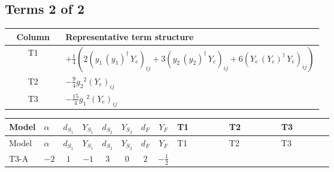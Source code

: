 \documentclass[8pt]{article}
\begin{document}
\begin{landscape}
\subsection*{Terms 2 of 2}
\begin{center}
\begin{tabular}{@{}c >{\raggedright\arraybackslash}p{0.82\linewidth}@{}}
\toprule
Column & Representative term structure \\
\midrule
T1 & \(\displaystyle +\frac{1}{4} (2 \left({y_1}\,\left({y_1}\right)^{\dagger}\,{Y_e}\right)_{ij}+3 \left({y_2}\,\left({y_2}\right)^{\dagger}\,{Y_e}\right)_{ij}+6 \left({Y_e}\,\left({Y_e}\right)^{\dagger}\,{Y_e}\right)_{ij})\) \\
\midrule
T2 & \(\displaystyle -\frac{9}{4} {g_2}^2 \left({Y_e}\right)_{ij}\) \\
\midrule
T3 & \(\displaystyle -\frac{15}{4} {g_1}^2 \left({Y_e}\right)_{ij}\) \\
\midrule
\bottomrule
\end{tabular}
\end{center}
\smallskip
\tiny
\begin{longtable}{@{}llcccccc >{\raggedright\arraybackslash}p{0.21\linewidth} >{\raggedright\arraybackslash}p{0.21\linewidth} >{\raggedright\arraybackslash}p{0.21\linewidth}@{}}
\toprule
Model & $\alpha$ & $d_{S_1}$ & $Y_{S_1}$ & $d_{S_2}$ & $Y_{S_2}$ & $d_F$ & $Y_F$ & T1 & T2 & T3 \\
\midrule
\endfirsthead
\toprule
Model & $\alpha$ & $d_{S_1}$ & $Y_{S_1}$ & $d_{S_2}$ & $Y_{S_2}$ & $d_F$ & $Y_F$ & T1 & T2 & T3 \\
\midrule
\endhead
T3-A & $-2$ & $1$ & $-1$ & $3$ & $0$ & $2$ & $-\frac{1}{2}$ & \scriptsize\adjustbox{max width=\linewidth}{$\begin{gathered} +\frac{1}{4} (2 \left({y_1}\,\left({y_1}\right)^{\dagger}\,{Y_e}\right)_{ij}+3 \left({y_2}\,\left({y_2}\right)^{\dagger}\,{Y_e}\right)_{ij}+6 \left({Y_e}\,\left({Y_e}\right)^{\dagger}\,{Y_e}\right)_{ij})\end{gathered}$} & \scriptsize\adjustbox{max width=\linewidth}{$\begin{gathered} -\frac{9}{4} {g_2}^2 \left({Y_e}\right)_{ij}\end{gathered}$} & \scriptsize\adjustbox{max width=\linewidth}{$\begin{gathered} -\frac{15}{4} {g_1}^2 \left({Y_e}\right)_{ij}\end{gathered}$} \\
\midrule
\bottomrule
\end{longtable}
\clearpage

\end{landscape}
\end{document}
